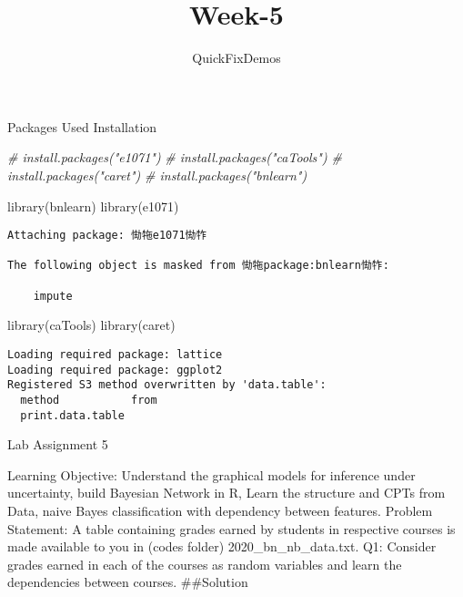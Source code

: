 \documentclass[
]{article}
\title{Week-5}
\author{QuickFixDemos}
\date{}
\newenvironment{Shaded}{\begin{snugshade}}{\end{snugshade}}
\newcommand{\CommentTok}[1]{\textcolor[rgb]{0.56,0.35,0.01}{\textit{#1}}}
\newcommand{\FunctionTok}[1]{\textcolor[rgb]{0.00,0.00,0.00}{#1}}
\newcommand{\NormalTok}[1]{#1}
\begin{document}
\maketitle

Packages Used Installation

\begin{Shaded}
\begin{Highlighting}[]
\CommentTok{\# install.packages("e1071") }
\CommentTok{\# install.packages("caTools") }
\CommentTok{\# install.packages("caret") }
\CommentTok{\# install.packages("bnlearn")}
\end{Highlighting}
\end{Shaded}

\begin{Shaded}
\begin{Highlighting}[]
\FunctionTok{library}\NormalTok{(bnlearn)}
\FunctionTok{library}\NormalTok{(e1071) }
\end{Highlighting}
\end{Shaded}

\begin{verbatim}
Attaching package: 㤼㸱e1071㤼㸲

The following object is masked from 㤼㸱package:bnlearn㤼㸲:

    impute
\end{verbatim}

\begin{Shaded}
\begin{Highlighting}[]
\FunctionTok{library}\NormalTok{(caTools) }
\FunctionTok{library}\NormalTok{(caret) }
\end{Highlighting}
\end{Shaded}

\begin{verbatim}
Loading required package: lattice
Loading required package: ggplot2
Registered S3 method overwritten by 'data.table':
  method           from
  print.data.table     
\end{verbatim}

Lab Assignment 5

Learning Objective: Understand the graphical models for inference under
uncertainty, build Bayesian Network in R, Learn the structure and CPTs
from Data, naive Bayes classification with dependency between features.
Problem Statement: A table containing grades earned by students in
respective courses is made available to you in (codes folder)
2020\_bn\_nb\_data.txt. Q1: Consider grades earned in each of the
courses as random variables and learn the dependencies between courses.
\#\#Solution
\end{document}

